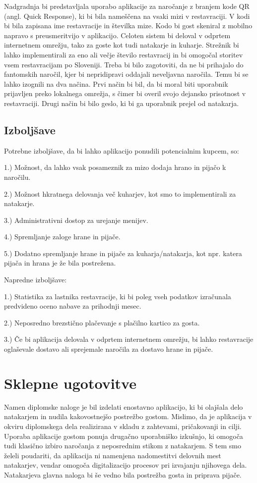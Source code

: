 \documentclass[a4paper, 12pt]{book}
\begin{document}
Nadgradnja bi predstavljala uporabo aplikacije za naročanje z branjem kode QR (angl. Quick Response), ki bi bila nameščena na vsaki mizi v restavraciji. V kodi bi bila zapisana ime restavracije in številka mize. Kodo bi gost skeniral z mobilno napravo s preusmeritvijo v aplikacijo. Celoten sistem bi deloval v odprtem internetnem omrežju, tako za goste kot tudi natakarje in kuharje. Strežnik bi lahko implementirali za eno ali večje število restavracij in bi omogočal storitev vsem restavracijam po Sloveniji. Treba bi bilo zagotoviti, da ne bi prihajalo do fantomskih naročil, kjer bi nepridipravi oddajali neveljavna naročila. Temu bi se lahko izognili na dva načina. Prvi način bi bil, da bi moral biti uporabnik prijavljen preko lokalnega omrežja, s čimer bi overil svojo dejansko prisotnost v restavraciji.
Drugi način bi bilo geslo, ki bi ga uporabnik prejel od natakarja. 


\section{Izboljšave}

Potrebne izboljšave, da bi lahko aplikacijo ponudili potencialnim kupcem, so:

1.) Možnost, da lahko vsak posameznik za mizo dodaja hrano in pijačo k naročilu.

2.) Možnost hkratnega delovanja več kuharjev, kot smo to implementirali za natakarje.

3.) Administrativni dostop za urejanje menijev.

4.) Spremljanje zaloge hrane in pijače.

5.) Dodatno spremljanje hrane in pijače za kuharja/natakarja, kot npr. katera pijača in hrana je že bila postrežena.


Napredne izboljšave: 

1.) Statistika za lastnika restavracije, ki bi poleg vseh podatkov izračunala predvideno oceno nabave za prihodnji mesec.

2.) Neposredno brezstično plačevanje s plačilno kartico za gosta.

3.) Če bi aplikacija delovala v odprtem internetnem omrežju, bi lahko restavracije oglaševale dostavo ali sprejemale naročila za dostavo hrane in pijače.


\chapter {Sklepne ugotovitve}
Namen diplomske naloge je bil izdelati enostavno aplikacijo, ki bi olajšala delo natakarjem in nudila kakovostnejšo postrežbo gostom. Mislimo, da je aplikacija v okviru diplomskega dela realizirana v skladu z zahtevami, pričakovanji in cilji. Uporaba aplikacije gostom ponuja drugačno uporabniško izkušnjo, ki omogoča tudi klasično izbiro naročanja z neposrednim stikom z natakarjem. S tem smo želeli poudariti, da aplikacija ni namenjena nadomestitvi delovnih mest natakarjev, vendar omogoča digitalizacijo procesov pri izvajanju njihovega dela. Natakarjeva glavna naloga bi še vedno bila postrežba gosta in priprava pijače. 
\end{document}

